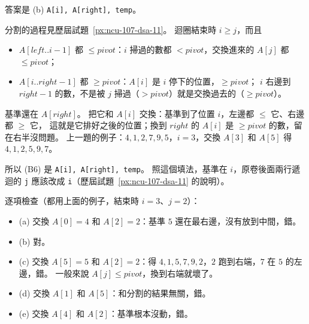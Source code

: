 \begin{pastsoln}
答案是 (b) \texttt{A[i], A[right], temp}。

分割的過程見歷屆試題~\ref{px:ncu-107-dsa-11}。 迴圈結束時 $i \ge j$，而且
\begin{itemize}
\item $A[\mathit{left}..i-1]$ 都 $\le \mathit{pivot}$：$i$ 掃過的數都 $< \mathit{pivot}$，交換進來的
$A[j]$ 都 $\le \mathit{pivot}$；
\item $A[i..\mathit{right}-1]$ 都 $\ge \mathit{pivot}$：$A[i]$ 是 $i$ 停下的位置，$\ge \mathit{pivot}$；
$i$ 右邊到 $\mathit{right}-1$ 的數，不是被 $j$ 掃過（$> \mathit{pivot}$）就是交換過去的（$\ge \mathit{pivot}$）。
\end{itemize}
基準還在 $A[\mathit{right}]$。 把它和 $A[i]$ 交換：基準到了位置 $i$，左邊都 $\le$ 它、右邊都 $\ge$ 它，
這就是它排好之後的位置；換到 $\mathit{right}$ 的 $A[i]$ 是 $\ge \mathit{pivot}$ 的數，留在右半沒問題。
上一題的例子：$4, 1, 2, 7, 9, 5$，$i = 3$，交換 $A[3]$ 和 $A[5]$ 得 $4, 1, 2, 5, 9, 7$。

所以 (B6) 是 \texttt{A[i], A[right], temp}。 照這個填法，基準在 $i$，原卷後面兩行遞迴的 \texttt{j}
應該改成 \texttt{i}（歷屆試題~\ref{px:ncu-107-dsa-11} 的說明）。

逐項檢查（都用上面的例子，結束時 $i = 3$、$j = 2$）：
\begin{itemize}
\item (a) 交換 $A[0] = 4$ 和 $A[2] = 2$：基準 $5$ 還在最右邊，沒有放到中間，錯。
\item (b) 對。
\item (c) 交換 $A[5] = 5$ 和 $A[2] = 2$：得 $4, 1, 5, 7, 9, 2$，$2$ 跑到右端，$7$ 在 $5$ 的左邊，錯。
一般來說 $A[j] \le \mathit{pivot}$，換到右端就壞了。
\item (d) 交換 $A[1]$ 和 $A[5]$：和分割的結果無關，錯。
\item (e) 交換 $A[4]$ 和 $A[2]$：基準根本沒動，錯。
\end{itemize}
\end{pastsoln}
